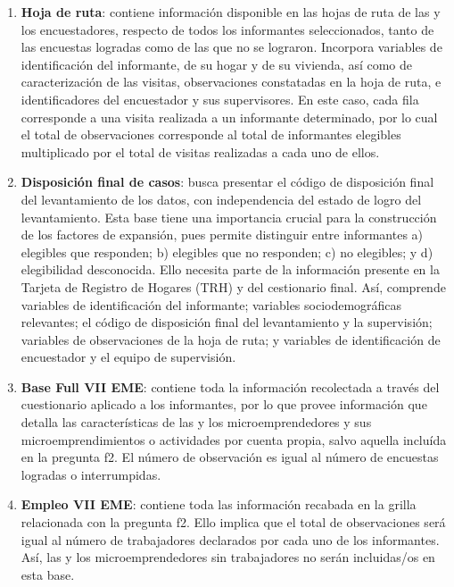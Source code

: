 \documentclass[
]{article}
\providecommand{\tightlist}{%
  \setlength{\itemsep}{0pt}\setlength{\parskip}{0pt}}
\begin{document}
\begin{enumerate}
\def\labelenumi{\arabic{enumi}.}
\tightlist
\item
  \textbf{Hoja de ruta}: contiene información disponible en las hojas de ruta de las y los encuestadores, respecto de todos los informantes seleccionados, tanto de las encuestas logradas como de las que no se lograron. Incorpora variables de identificación del informante, de su hogar y de su vivienda, así como de caracterización de las visitas, observaciones constatadas en la hoja de ruta, e identificadores del encuestador y sus supervisores. En este caso, cada fila corresponde a una visita realizada a un informante determinado, por lo cual el total de observaciones corresponde al total de informantes elegibles multiplicado por el total de visitas realizadas a cada uno de ellos.
\item
  \textbf{Disposición final de casos}: busca presentar el código de disposición final del levantamiento de los datos, con independencia del estado de logro del levantamiento. Esta base tiene una importancia crucial para la construcción de los factores de expansión, pues permite distinguir entre informantes a) elegibles que responden; b) elegibles que no responden; c) no elegibles; y d) elegibilidad desconocida. Ello necesita parte de la información presente en la Tarjeta de Registro de Hogares (TRH) y del cestionario final. Así, comprende variables de identificación del informante; variables sociodemográficas relevantes; el código de disposición final del levantamiento y la supervisión; variables de observaciones de la hoja de ruta; y variables de identificación de encuestador y el equipo de supervisión.
\item
  \textbf{Base Full VII EME}: contiene toda la información recolectada a través del cuestionario aplicado a los informantes, por lo que provee información que detalla las características de las y los microemprendedores y sus microemprendimientos o actividades por cuenta propia, salvo aquella incluída en la pregunta f2. El número de observación es igual al número de encuestas logradas o interrumpidas.
\item
  \textbf{Empleo VII EME}: contiene toda las información recabada en la grilla relacionada con la pregunta f2. Ello implica que el total de observaciones será igual al número de trabajadores declarados por cada uno de los informantes. Así, las y los microemprendedores sin trabajadores no serán incluidas/os en esta base.
\end{enumerate}
\end{document}
